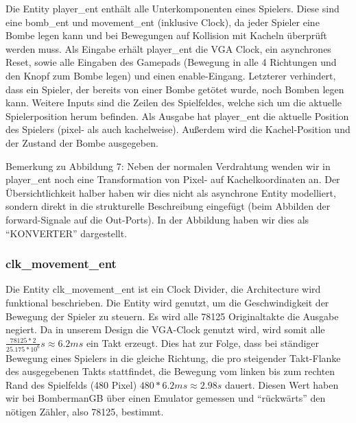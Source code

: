 \documentclass[parskip=full]{scrartcl}
\begin{document}
				Die Entity player\_ent enthält alle Unterkomponenten eines Spielers. 
				Diese sind eine bomb\_ent und movement\_ent (inklusive Clock), da jeder Spieler eine Bombe legen kann und bei Bewegungen auf Kollision mit Kacheln überprüft werden muss.
				Als Eingabe erhält player\_ent die VGA Clock, ein asynchrones Reset, sowie alle Eingaben des Gamepads (Bewegung in alle 4 Richtungen und den Knopf zum Bombe legen) und einen enable-Eingang. Letzterer verhindert, dass ein Spieler, der bereits von einer Bombe getötet wurde, noch Bomben legen kann. Weitere Inputs sind die Zeilen des Spielfeldes, welche sich um die aktuelle Spielerposition herum befinden.
				Als Ausgabe hat player\_ent die aktuelle Position des Spielers (pixel- als auch kachelweise). Außerdem wird die Kachel-Position und der Zustand der Bombe ausgegeben.
				
				Bemerkung zu Abbildung 7: Neben der normalen Verdrahtung wenden wir in player\_ent noch eine Transformation von Pixel- auf Kachelkoordinaten an. Der Übersichtlichkeit halber haben wir dies nicht als asynchrone Entity modelliert, sondern direkt in die strukturelle Beschreibung eingefügt (beim Abbilden der forward-Signale auf die Out-Ports). In der Abbildung haben wir dies als \enquote{KONVERTER} dargestellt.
				\subsubsection{clk\_movement\_ent}
				Die Entity clk\_movement\_ent ist ein Clock Divider, die Architecture wird funktional beschrieben. Die Entity wird genutzt, um die Geschwindigkeit der Bewegung der Spieler zu steuern. Es wird alle 78125 Originaltakte die Ausgabe negiert. Da in unserem Design die VGA-Clock genutzt wird, wird somit alle $\frac{78125 * 2}{25.175 * 10^6}s \approx 6.2ms$ ein Takt erzeugt. Dies hat zur Folge, dass bei ständiger Bewegung eines Spielers in die gleiche Richtung, die pro steigender Takt-Flanke des ausgegebenen Takts stattfindet, die Bewegung vom linken bis zum rechten Rand des Spielfelds (480 Pixel) $480 * 6.2 ms \approx 2.98 s$ dauert. Diesen Wert haben wir bei BombermanGB über einen Emulator gemessen und \enquote{rückwärts} den nötigen Zähler, also 78125, bestimmt.
\end{document}
